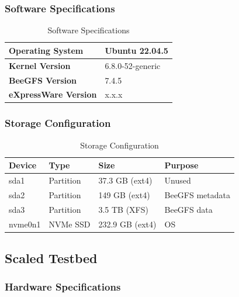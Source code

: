 \subsubsection{Software Specifications}
\begin{table}[H]
    \centering
    \caption{Software Specifications}
    \label{tab:software_specs}
    \begin{tabularx}{\textwidth}{|X|X|}
        \hline

        \textbf{Operating System} & Ubuntu 22.04.5 \\
        \hline
        \textbf{Kernel Version} & 6.8.0-52-generic \\
        \hline
        \textbf{BeeGFS Version} & 7.4.5\\ %
        \hline
        \textbf{eXpressWare Version} & x.x.x \\
        \hline
    \end{tabularx}
\end{table}

\subsubsection{Storage Configuration}
\begin{table}[H]
    \centering
    \caption{Storage Configuration}
    \label{tab:storage_specs}
    \begin{tabularx}{\textwidth}{|l|X|X|X|}
        \hline
        \textbf{Device} & \textbf{Type} & \textbf{Size} & \textbf{Purpose} \\
        \hline
        sda1 & Partition & 37.3 GB (ext4) & Unused \\
        sda2 & Partition & 149 GB (ext4) & BeeGFS metadata \\
        sda3 & Partition & 3.5 TB (XFS) & BeeGFS data \\
        nvme0n1 & NVMe SSD & 232.9 GB (ext4) & OS \\
        \hline
    \end{tabularx}
\end{table}

\subsection{Scaled Testbed}

\subsubsection{Hardware Specifications}

